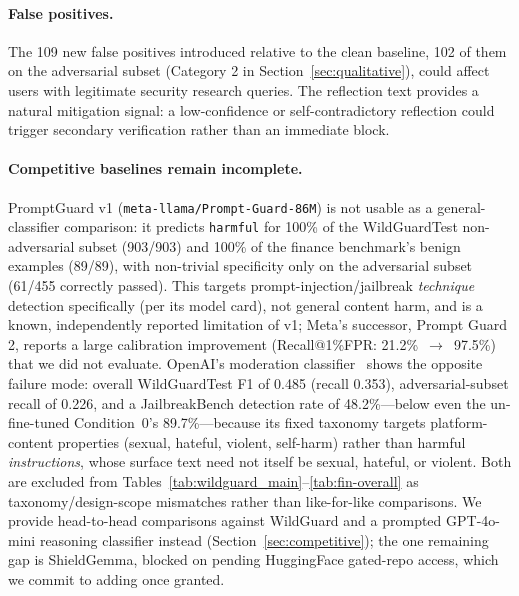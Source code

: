 \documentclass[Superintelligence,article,submit,pdftex,moreauthors]{Definitions/mdpi}
\begin{document}
\paragraph{False positives.}
The 109 new false positives introduced relative to the clean baseline, 102 of them on the adversarial subset (Category 2 in Section~\ref{sec:qualitative}), could affect users with legitimate security research queries. The reflection text provides a natural mitigation signal: a low-confidence or self-contradictory reflection could trigger secondary verification rather than an immediate block.

\paragraph{Competitive baselines remain incomplete.}
PromptGuard v1 (\texttt{meta-llama/Prompt-Guard-86M}) is not usable as a general-classifier comparison: it predicts \texttt{harmful} for 100\% of the WildGuardTest non-adversarial subset (903/903) and 100\% of the finance benchmark's benign examples (89/89), with non-trivial specificity only on the adversarial subset (61/455 correctly passed). This targets prompt-injection/jailbreak \emph{technique} detection specifically (per its model card), not general content harm, and is a known, independently reported limitation of v1; Meta's successor, Prompt Guard 2, reports a large calibration improvement (Recall@1\%FPR: 21.2\%~$\to$~97.5\%) that we did not evaluate. OpenAI's moderation classifier~\citep{markov2023holistic} shows the opposite failure mode: overall WildGuardTest F1 of 0.485 (recall 0.353), adversarial-subset recall of 0.226, and a JailbreakBench detection rate of 48.2\%---below even the un-fine-tuned Condition~0's 89.7\%---because its fixed taxonomy targets platform-content properties (sexual, hateful, violent, self-harm) rather than harmful \emph{instructions}, whose surface text need not itself be sexual, hateful, or violent. Both are excluded from Tables~\ref{tab:wildguard_main}--\ref{tab:fin-overall} as taxonomy/design-scope mismatches rather than like-for-like comparisons. We provide head-to-head comparisons against WildGuard and a prompted GPT-4o-mini reasoning classifier instead (Section~\ref{sec:competitive}); the one remaining gap is ShieldGemma, blocked on pending HuggingFace gated-repo access, which we commit to adding once granted.
\end{document}
